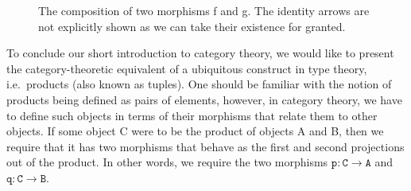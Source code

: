 \documentclass[12pt,twoside,maitrise]{dms}
\theoremstyle{definition}
\numberwithin{equation}{section}
\numberwithin{table}{chapter}
\numberwithin{figure}{chapter}
\newcommand\id[1] {\texttt{#1}}
\begin{document}
\begin{figure}

\caption{The composition of two morphisms f and g. The identity arrows are not explicitly shown as we can take their existence for granted.}\label{fig:cat-theory-composition}

\end{figure}

To conclude our short introduction to category theory, we would like to present
the category-theoretic equivalent of a ubiquitous construct in type theory,
i.e.\ products (also known as tuples). One should be familiar with the notion of
products being defined as pairs of elements, however, in category theory, we have
to define such objects in terms of their morphisms that relate them to other
objects. If some object C were to be the product of objects A and B, then we
require that it has two morphisms that behave as the first and second
projections out of the product. In other words, we require the two morphisms
$\id{p} : \id{C} \rightarrow \id{A}$ and $\id{q} : \id{C} \rightarrow \id{B}$.
\end{document}
